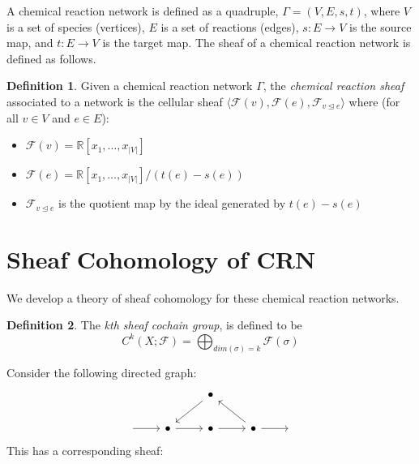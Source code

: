 \documentclass[12pt]{article}
\theoremstyle{definition}
\newtheorem{definition}{Definition}
\newcommand{\F}{\mathcal{F}}
\newcommand{\<}{\langle}
\renewcommand{\>}{\rangle}
\begin{document}
A chemical reaction network is defined as a quadruple, $\Gamma = (V, E, s, t)$, where $V$ is a set of
species (vertices), $E$ is a set of reactions (edges), $s: E \to V$ is the source map, and
$t: E \to V$ is the target map. The sheaf of a chemical reaction network is defined as follows.

\begin{definition} Given a chemical reaction network $\Gamma$, the \textit{chemical reaction sheaf} associated to a 
network is the cellular sheaf $ \< \F(v) , \F(e), \F_{v \trianglelefteq e} \>$ where
(for all $v \in V $ and $e \in E$):

\begin{itemize}
  \item $\F(v) = \mathbb{R}[x_1, \ldots, x_{|V|}]$
  \item $\F(e) = \mathbb{R}[x_1, \ldots, x_{|V|}] / (t(e) - s(e))$
  \item $\F_{v \trianglelefteq e}$ is the quotient map by the ideal generated
    by $t(e) - s(e)$
\end{itemize}
\end{definition}

\section{Sheaf Cohomology of CRN}

We develop a theory of sheaf cohomology for these chemical reaction networks. 
\begin{definition}
  The \textit{kth sheaf cochain group}, is defined to be
  \begin{equation*}
    C^k(X ; \F) = \bigoplus_{dim(\sigma) = k} \F(\sigma)
  \end{equation*}
\end{definition}

Consider the following directed graph:
\[\begin{tikzcd}
	&& \bullet \\
	{} & \bullet & \bullet & \bullet & {}
	\arrow[from=1-3, to=2-2]
	\arrow[from=2-1, to=2-2]
	\arrow[from=2-2, to=2-3]
	\arrow[from=2-3, to=2-4]
	\arrow[from=2-4, to=1-3]
	\arrow[from=2-4, to=2-5]
\end{tikzcd}\]
This has a corresponding sheaf:
\end{document}
